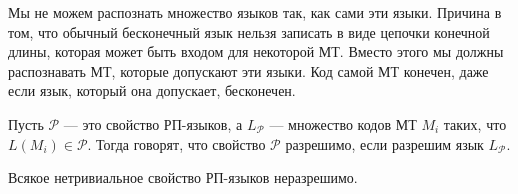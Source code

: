 Мы не можем распознать множество языков так, как сами эти языки.
Причина в том, что обычный бесконечный язык нельзя записать в виде
цепочки конечной длины, которая может быть входом для некоторой МТ.
Вместо этого мы должны распознавать МТ, которые допускают эти языки.
Код самой МТ конечен, даже если язык, который она допускает,
бесконечен.
\begin{define}
  Пусть $\mathcal P$ --- это свойство РП-языков, а $L_{\mathcal P}$ ---
  множество кодов МТ $M_i$ таких, что $L(M_i)\in\mathcal P$. Тогда
  говорят, что свойство $\mathcal P$ разрешимо, если разрешим язык
  $L_{\mathcal P}$.
\end{define}
\begin{theorem}
Всякое нетривиальное свойство РП-языков неразрешимо.
\end{theorem}


